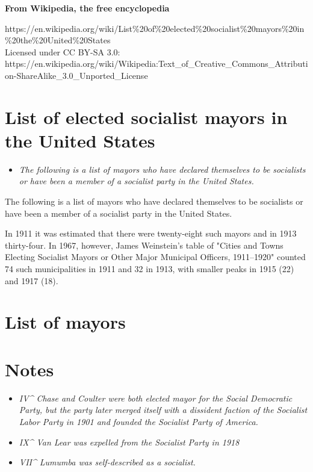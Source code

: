 \textbf{From Wikipedia, the free encyclopedia}

https://en.wikipedia.org/wiki/List\%20of\%20elected\%20socialist\%20mayors\%20in\%20the\%20United\%20States\\
Licensed under CC BY-SA 3.0:\\
https://en.wikipedia.org/wiki/Wikipedia:Text\_of\_Creative\_Commons\_Attribution-ShareAlike\_3.0\_Unported\_License

\section{List of elected socialist mayors in the United
States}\label{list-of-elected-socialist-mayors-in-the-united-states}

\begin{itemize}
\item
  \emph{The following is a list of mayors who have declared themselves
  to be socialists or have been a member of a socialist party in the
  United States.}
\end{itemize}

The following is a list of mayors who have declared themselves to be
socialists or have been a member of a socialist party in the United
States.

In 1911 it was estimated that there were twenty-eight such mayors and in
1913 thirty-four. In 1967, however, James Weinstein's table of "Cities
and Towns Electing Socialist Mayors or Other Major Municipal Officers,
1911--1920" counted 74 such municipalities in 1911 and 32 in 1913, with
smaller peaks in 1915 (22) and 1917 (18).

\section{List of mayors}\label{list-of-mayors}

\section{Notes}\label{notes}

\begin{itemize}
\item
  \emph{IV\^{} Chase and Coulter were both elected mayor for the Social
  Democratic Party, but the party later merged itself with a dissident
  faction of the Socialist Labor Party in 1901 and founded the Socialist
  Party of America.}
\item
  \emph{IX\^{} Van Lear was expelled from the Socialist Party in 1918}
\item
  \emph{VII\^{} Lumumba was self-described as a socialist.}
\end{itemize}

